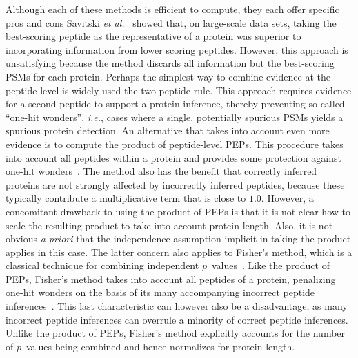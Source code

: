 \documentclass{article}
\begin{document}
Although each of these methods is efficient to compute, they each
offer specific pros and cons  Savitski {\em et
  al.}~\cite{savitski2015scalable} showed that, on large-scale
data sets, taking the best-scoring peptide as the representative of a
protein was superior to incorporating information from lower scoring
peptides. However, this approach is unsatisfying because the method
discards all information but the best-scoring PSMs for each protein.
Perhaps the simplest way to combine evidence at the peptide level is
widely used the two-peptide rule.  This approach requires evidence for
a second peptide to support a protein inference, thereby preventing
so-called ``one-hit wonders'', {\em i.e.}, cases where a single,
potentially spurious PSMs yields a spurious protein detection. An
alternative that takes into account even more evidence is to compute
the product of peptide-level PEPs. This procedure takes into account
all peptides within a protein and provides some protection against
one-hit wonders~\cite{cox2008maxquant}. The method also has the
benefit that correctly inferred proteins are not strongly affected by
incorrectly inferred peptides, because these typically contribute a
multiplicative term that is close to $1.0$. However, a concomitant
drawback to using the product of PEPs is that it is not clear how to
scale the resulting product to take into account protein length.
Also, it is not obvious {\em a priori} that the independence
assumption implicit in taking the product applies in this case.  The
latter concern also applies to Fisher's method, which is a classical
technique for combining independent
$p$~values~\cite{fisher1925statistical}. Like the product of PEPs,
Fisher's method takes into account all peptides of a protein,
penalizing one-hit wonders on the basis of its many accompanying
incorrect peptide inferences~\cite{spirin2011assigning,
  alves2015mass, granholm2013determining}.
This last characteristic can however also be a disadvantage, as many
incorrect peptide inferences can overrule a minority of correct
peptide inferences.  Unlike the product of PEPs, Fisher's method
explicitly accounts for the number of $p$~values being combined and
hence normalizes for protein length.
\end{document}
